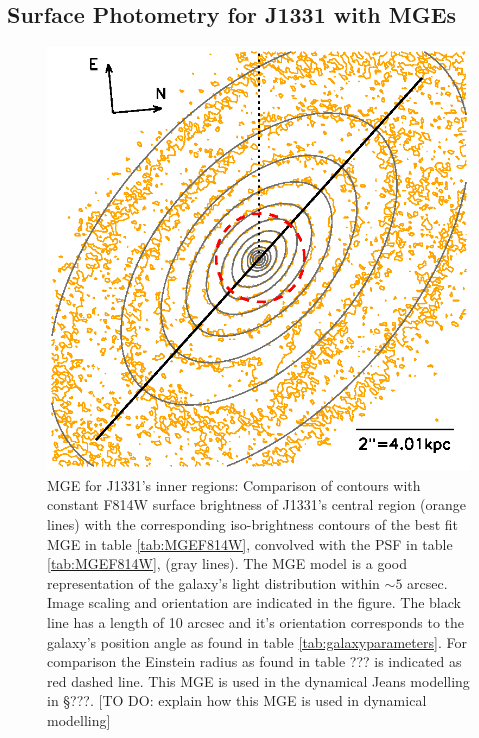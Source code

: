 \subsection{Surface Photometry for J1331 with MGEs}


\begin{figure}
\centering
\includegraphics[width=0.8\columnwidth]{fig/1331F814Wsci_MGE_M.ps}
\caption{MGE for J1331's inner regions: Comparison of contours with constant F814W surface brightness of J1331's central region (orange lines) with the corresponding iso-brightness contours of the best fit MGE in table \ref{tab:MGEF814W}, convolved with the PSF in table \ref{tab:MGEF814W}, (gray lines). The MGE model is a good representation of the galaxy's light distribution within $\sim 5$ arcsec. Image scaling and orientation are indicated in the figure. The black line has a length of 10 arcsec and it's orientation corresponds to the galaxy's position angle as found in table \ref{tab:galaxyparameters}. For comparison the Einstein radius as found in table ??? is indicated as red dashed line. This MGE is used in the dynamical Jeans modelling in \S ???. [TO DO: explain how this MGE is used in dynamical modelling]}
\label{fig:MGEinnerRegions}
\end{figure}

